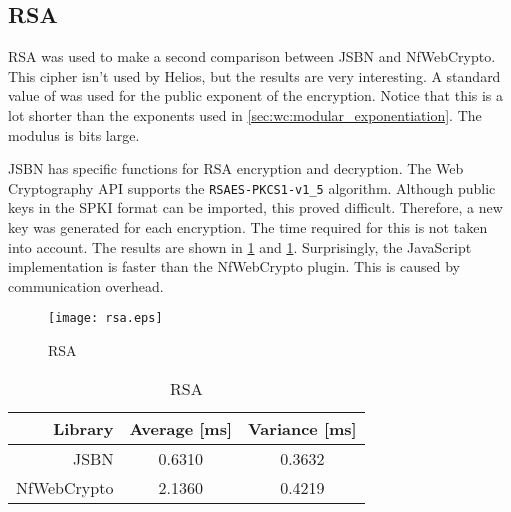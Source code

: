 \subsection{RSA}

RSA was used to make a second comparison between JSBN and NfWebCrypto. This cipher isn't used by Helios, but the results are very interesting. A standard value of  was used for the public exponent of the encryption. Notice that this is a lot shorter than the exponents used in \ref{sec:wc:modular_exponentiation}. The modulus is  bits large.

\par JSBN has specific functions for RSA encryption and decryption. The Web Cryptography API supports the \texttt{RSAES-PKCS1-v1\_5} algorithm.\cite{rfc3447} Although public keys in the SPKI format can be imported, this proved difficult. Therefore, a new key was generated for each encryption. The time required for this is not taken into account. The results are shown in \ref{fig:wc:rsa} and \ref{tab:wc:rsa}. Surprisingly, the JavaScript implementation is faster than the NfWebCrypto plugin. This is caused by communication overhead.

\begin{figure}
  \centering
  \texttt{[image: rsa.eps]}
  \caption{RSA}
  \label{fig:wc:rsa}
\end{figure}

\begin{table}
  \centering
  \caption{RSA}
  \label{tab:wc:rsa}
  \begin{tabular}{r | c c}
    Library & Average [ms] & Variance [ms] \\ \hline
    JSBN & 0.6310 & 0.3632  \\
    NfWebCrypto & 2.1360 & 0.4219
  \end{tabular}
\end{table}